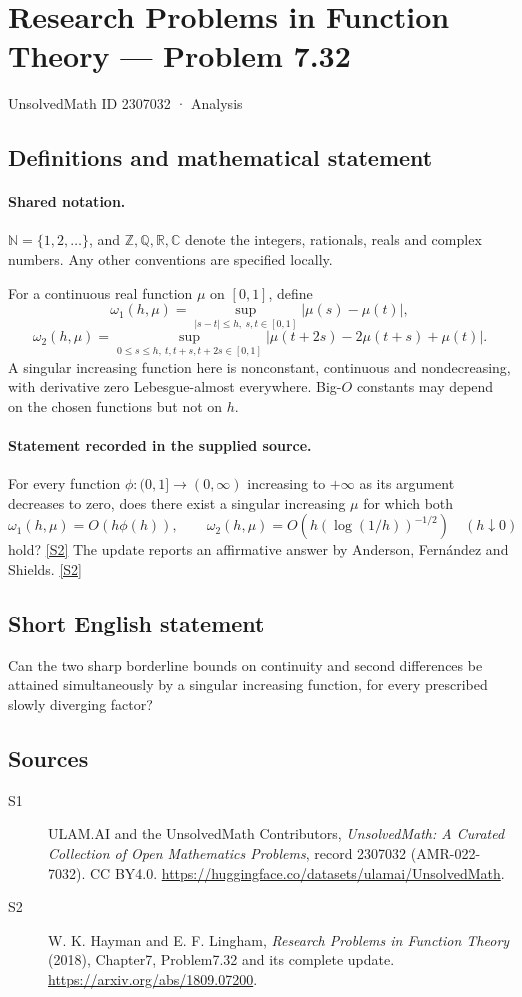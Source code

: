 \documentclass[11pt]{article}
\newcommand{\sref}[2]{\hyperlink{source:#1:#2}{[S#2]}}
\begin{document}
\setcounter{section}{2307031}
\section{Research Problems in Function Theory — Problem 7.32}\label{2307032}
{\small\sffamily UnsolvedMath ID 2307032 · Analysis}
\subsection{Definitions and mathematical statement}

\paragraph{Shared notation.}$\mathbb N=\{1,2,\ldots\}$, and $\mathbb Z,\mathbb Q,\mathbb R,\mathbb C$ denote the integers, rationals, reals and complex numbers. Any other conventions are specified locally.


For a continuous real function $\mu$ on $[0,1]$, define
\[\omega_1(h,\mu)=\sup_{|s-t|\le h,\ s,t\in[0,1]}|\mu(s)-\mu(t)|,\]
\[\omega_2(h,\mu)=\sup_{0\le s\le h,\ t,t+s,t+2s\in[0,1]}|\mu(t+2s)-2\mu(t+s)+\mu(t)|.\]
A singular increasing function here is nonconstant, continuous and nondecreasing, with derivative zero Lebesgue-almost everywhere. Big-$O$ constants may depend on the chosen functions but not on $h$.

\paragraph{Statement recorded in the supplied source.}
For every function $\phi:(0,1]\to(0,\infty)$ increasing to $+\infty$ as its argument decreases to zero, does there exist a singular increasing $\mu$ for which both
\[\omega_1(h,\mu)=O(h\phi(h)),\qquad
\omega_2(h,\mu)=O\!\left(h(\log(1/h))^{-1/2}\right)\quad(h\downarrow0)
\]
hold? \sref{2307032}{2}
The update reports an affirmative answer by Anderson, Fernández and Shields. \sref{2307032}{2}
\subsection{Short English statement}
Can the two sharp borderline bounds on continuity and second differences be attained simultaneously by a singular increasing function, for every prescribed slowly diverging factor?
\subsection{Sources}
\begin{description}
\item[\hypertarget{source:2307032:1}{S1}] ULAM.AI and the UnsolvedMath Contributors, \emph{UnsolvedMath: A Curated Collection of Open Mathematics Problems}, record 2307032 (AMR-022-7032). CC BY4.0. \url{https://huggingface.co/datasets/ulamai/UnsolvedMath}.
\item[\hypertarget{source:2307032:2}{S2}] W. K. Hayman and E. F. Lingham, \emph{Research Problems in Function Theory} (2018), Chapter7, Problem7.32 and its complete update. \url{https://arxiv.org/abs/1809.07200}.
\end{description}
\label{end:2307032}
\end{document}
